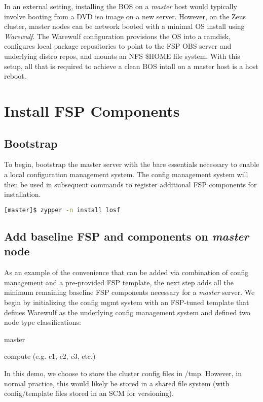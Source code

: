 \documentclass[letterpaper]{article}
\begin{document}
In an external setting, installing the BOS on a {\em master} host would
typically involve booting from a DVD iso image on a new server.  However, on
the Zeus cluster, master nodes can be network booted with a minimal OS
install using {\em Warewulf}. The Warewulf configuration provisions the OS into
a ramdisk, configures local package repositories to point to the FSP OBS server and
underlying distro repos, and mounts an NFS \$HOME file system. With this setup,
all that is required to achieve a clean BOS intall on a master host is a host
reboot. 

\section{Install FSP Components}

\subsection{Bootstrap}

To begin, bootstrap the master server with the bare essentials necessary to
enable a local configuration management system. The config management system
will then be used in subsequent commands to register additional FSP components
for installation.

\vspace*{0.2cm}

\begin{lstlisting}[language=bash]
[master]$ zypper -n install losf
\end{lstlisting}


\subsection{Add baseline FSP and components on {\em master} node}

As an example of the convenience that can be added via combination of config
management and a pre-provided FSP template, the next step adds all the minimum
remaining baseline FSP components necessary for a {\em master} server. We begin
by initializing the config mgmt system with an FSP-tuned template that defines
Warewulf as the underlying config management system and defined two node type
classifications:
\begin{itemize*}
\item master
\item compute (e.g. c1, c2, c3, etc.)
\end{itemize*}
In this demo, we choose to store the cluster config files in /tmp. However, in
normal practice, this would likely be stored in a shared file system (with
config/template files stored in an SCM for versioning).
\end{document}
